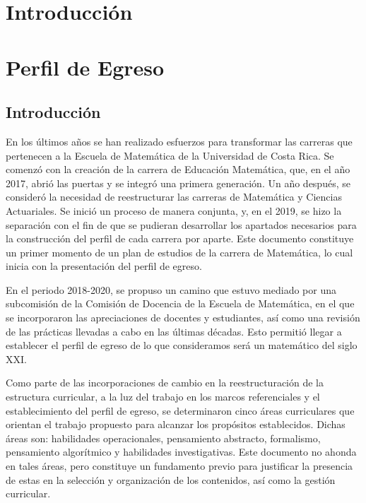 ﻿%
%

\maketitle

\tableofcontents

\chapter{Introducción}

\chapter{Perfil de Egreso}

\section{Introducción}

En los últimos años se han realizado esfuerzos para transformar las carreras que pertenecen a la Escuela de Matemática de la Universidad de Costa Rica. Se comenzó con la creación de la carrera de Educación Matemática, que, en el año 2017, abrió las puertas y se integró una primera generación. Un año después, se consideró la necesidad de reestructurar las carreras de Matemática y Ciencias Actuariales. Se inició un proceso de manera conjunta, y, en el 2019, se hizo la separación con el fin de que se pudieran desarrollar los apartados necesarios para la construcción del perfil de cada carrera por aparte. Este documento constituye un primer momento de un plan de estudios de la carrera de Matemática, lo cual inicia con la presentación del perfil de egreso.

En el periodo 2018-2020, se propuso un camino que estuvo mediado por una subcomisión de la Comisión de Docencia de la Escuela de Matemática, en el que se incorporaron las apreciaciones de docentes y estudiantes, así como una revisión de las prácticas llevadas a cabo en las últimas décadas. Esto permitió llegar a establecer el perfil de egreso de lo que consideramos será un matemático del siglo XXI.

Como parte de las incorporaciones de cambio en la reestructuración de la estructura curricular, a la luz del trabajo en los marcos referenciales y el establecimiento del perfil de egreso, se determinaron cinco áreas curriculares que orientan el trabajo propuesto para alcanzar los propósitos establecidos. Dichas áreas son: habilidades operacionales, pensamiento abstracto, formalismo, pensamiento algorítmico y habilidades investigativas. Este documento no ahonda en tales áreas, pero constituye un fundamento previo para justificar la presencia de estas en la selección y organización de los contenidos, así como la gestión curricular. 

